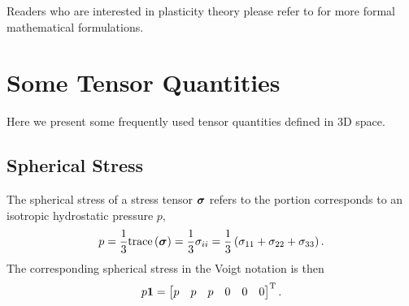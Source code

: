Readers who are interested in plasticity theory please refer to \cite{Simo1998} for more formal mathematical formulations.
\section{Some Tensor Quantities}
Here we present some frequently used tensor quantities defined in 3D space.
\subsection{Spherical Stress}
The spherical stress of a stress tensor $\bm{\sigma}$ refers to the portion corresponds to an isotropic hydrostatic pressure $p$,
\begin{gather}
p=\dfrac{1}{3}\text{trace}\left(\bm{\sigma}\right)=\dfrac{1}{3}\sigma_{ii}=\dfrac{1}{3}\left(\sigma_{11}+\sigma_{22}+\sigma_{33}\right).
\end{gather}
The corresponding spherical stress in the Voigt notation is then
\begin{gather}
p\bm{1}=\begin{bmatrix}p&p&p&0&0&0\end{bmatrix}^{\mathrm{T}}.
\end{gather}
